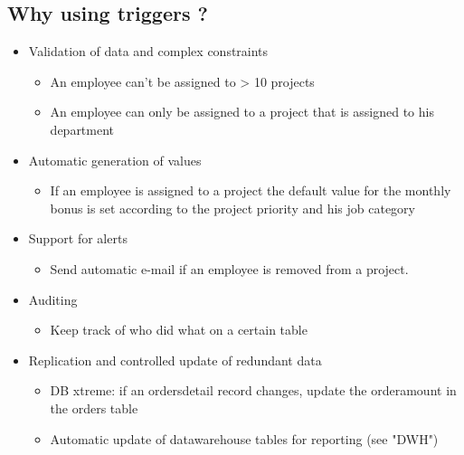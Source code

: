 \documentclass{report}
\begin{document}
    \subsection{Why using triggers ?}
    \begin{itemize}
        \item Validation of data and complex constraints
        \begin{itemize}
            \item An employee can't be assigned to > 10 projects
            \item An employee can only be assigned to a project that is assigned to his department
        \end{itemize}
        \item Automatic generation of values
        \begin{itemize}
            \item If an employee is assigned to a project the default value for the monthly bonus is set  according to the project priority and his job category
        \end{itemize}
        \item Support for alerts
        \begin{itemize}
            \item Send automatic e-mail if an employee is removed from a project.
        \end{itemize}
        \item Auditing
        \begin{itemize}
            \item Keep track of who did what on a certain table
        \end{itemize}
        \item Replication and controlled update of redundant data
        \begin{itemize}
            \item DB xtreme: if an ordersdetail record changes, update the orderamount in the orders table
            \item Automatic update of datawarehouse tables for reporting (see "DWH")
        \end{itemize}
    \end{itemize}
\end{document}

